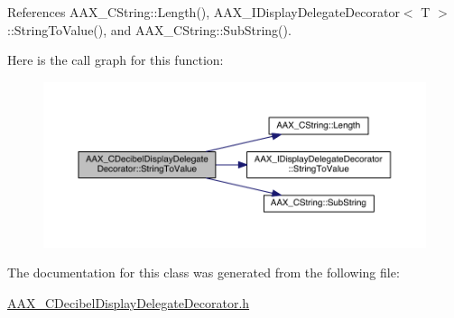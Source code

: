 References A\+A\+X\+\_\+\+C\+String\+::\+Length(), A\+A\+X\+\_\+\+I\+Display\+Delegate\+Decorator$<$ T $>$\+::\+String\+To\+Value(), and A\+A\+X\+\_\+\+C\+String\+::\+Sub\+String().



Here is the call graph for this function\+:
\nopagebreak
\begin{figure}[H]
\begin{center}
\leavevmode
\includegraphics[width=350pt]{a00015_a7f4645d7e464d63ef22e93c4a99f3f09_cgraph}
\end{center}
\end{figure}




The documentation for this class was generated from the following file\+:\begin{DoxyCompactItemize}
\item 
\hyperlink{a00169}{A\+A\+X\+\_\+\+C\+Decibel\+Display\+Delegate\+Decorator.\+h}\end{DoxyCompactItemize}

